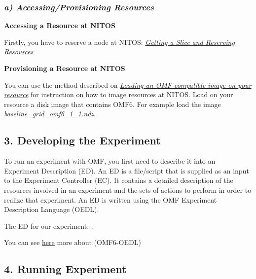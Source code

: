 \documentclass[letterpaper,10pt,english]{sphinxmanual}
\begin{document}
\subsubsection{\emph{a) Accessing/Provisioning Resources}}
\label{wireless_example:a-accessing-provisioning-resources}
\begin{DUlineblock}{0em}
\item[] \textbf{Accessing a Resource at NITOS}
\item[] 
\item[] Firstly, you have to reserve a node at NITOS: {\hyperref[get_reserve:label-name]{\emph{Getting a Slice and Reserving Resources}}}
\end{DUlineblock}

\begin{DUlineblock}{0em}
\item[] \textbf{Provisioning a Resource at NITOS}
\item[] 
\item[] You can use the method described on {\hyperref[loadOMF:label-name-2]{\emph{Loading an OMF-compatible image on your resource}}} for instruction on how to image resources at NITOS. Load on your resource a disk image that contains OMF6. For example load the image \emph{baseline\_grid\_omf6\_1\_1.ndz}.
\end{DUlineblock}


\subsection{3. Developing the Experiment}
\label{wireless_example:developing-the-experiment}
To run an experiment with OMF, you first need to describe it into an Experiment Description (ED). An ED is a file/script that is supplied as an input to the Experiment Controller (EC). It contains a detailed description of the resources involved in an experiment and the sets of actions to perform in order to realize that experiment. An ED is written using the OMF Experiment Description Language (OEDL).

The ED for our experiment: .

You can see \href{http://omf.mytestbed.net/projects/omf6/wiki/OEDLOMF6}{here}  more about (OMF6-OEDL)


\subsection{4. Running Experiment}
\label{wireless_example:running-experiment}
\end{document}
